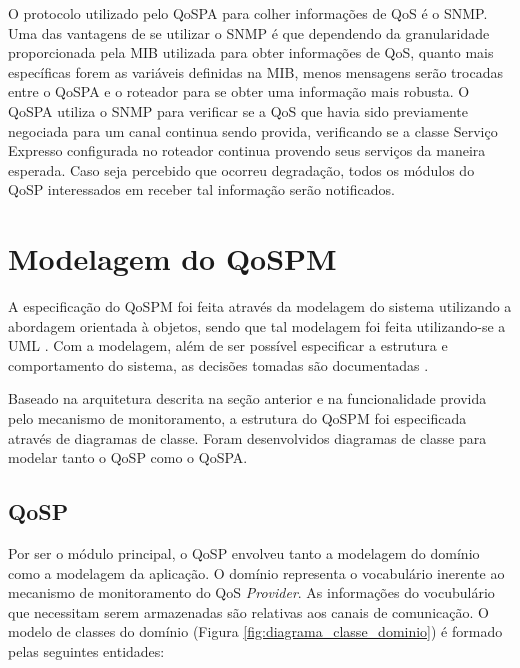 	O protocolo utilizado pelo QoSPA para colher informações de QoS é o SNMP. Uma das vantagens de se utilizar o SNMP é que dependendo da granularidade proporcionada pela MIB utilizada para obter informações de QoS, quanto mais específicas forem as variáveis definidas na MIB, menos mensagens serão trocadas entre o QoSPA e o roteador para se obter uma informação mais robusta. O QoSPA utiliza o SNMP para verificar se a QoS que havia sido previamente negociada para um canal continua sendo provida, verificando se a classe Serviço Expresso configurada no roteador continua provendo seus serviços da maneira esperada. Caso seja percebido que ocorreu degradação, todos os módulos do QoSP interessados em receber tal informação serão notificados.
	
\section{Modelagem do QoSPM}
	A especificação do QoSPM foi feita através da modelagem do sistema utilizando a abordagem orientada à objetos, sendo que tal modelagem foi feita utilizando-se a UML \cite{UML99}. Com a modelagem, além de ser possível especificar a estrutura e comportamento do sistema, as decisões tomadas são documentadas \cite{UML99}.
	
	Baseado na arquitetura descrita na seção anterior e na funcionalidade provida pelo mecanismo de monitoramento, a estrutura do QoSPM foi especificada através de diagramas de classe. Foram desenvolvidos diagramas de classe para modelar tanto o QoSP como o QoSPA.
	
\subsection{QoSP}
	Por ser o módulo principal, o QoSP envolveu tanto a modelagem do domínio como a modelagem da aplicação. O domínio representa o vocabulário inerente ao mecanismo de monitoramento do QoS \textit{Provider}. As informações do vocubulário que necessitam serem armazenadas são relativas aos canais de comunicação. O modelo de classes do domínio (Figura \ref{fig:diagrama_classe_dominio}) é formado pelas seguintes entidades:
	
